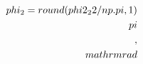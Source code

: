 \documentclass[preview]{standalone}
\begin{document}
\begin{align*}
\special{dvisvgm:raw <g id='unique000'>}\\phi_2 = {round(phi2_22/np.pi, 1)}\\pi\\,\\mathrm{{rad}}\special{dvisvgm:raw </g>}
\end{align*}
\end{document}
